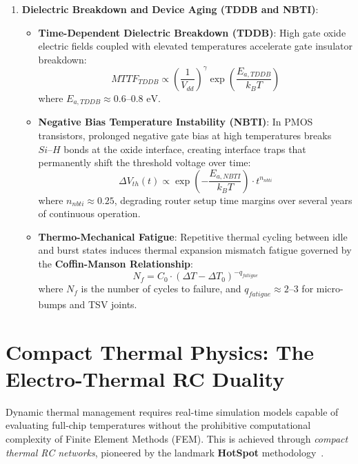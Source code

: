 \begin{enumerate}
    \item \textbf{Dielectric Breakdown and Device Aging (TDDB and NBTI)}: 
    \begin{itemize}
        \item \textbf{Time-Dependent Dielectric Breakdown (TDDB)}: High gate oxide electric fields coupled with elevated temperatures accelerate gate insulator breakdown:
        \begin{equation}
        MTTF_{TDDB} \propto \left(\frac{1}{V_{dd}}\right)^{\gamma} \exp\left(\frac{E_{a, TDDB}}{k_B T}\right)
        \label{eq:tddb}
        \end{equation}
        where $E_{a, TDDB} \approx 0.6\text{--}0.8\text{ eV}$.
        \item \textbf{Negative Bias Temperature Instability (NBTI)}: In PMOS transistors, prolonged negative gate bias at high temperatures breaks $Si\text{--}H$ bonds at the oxide interface, creating interface traps that permanently shift the threshold voltage over time:
        \begin{equation}
        \Delta V_{th}(t) \propto \exp\left(-\frac{E_{a, NBTI}}{k_B T}\right) \cdot t^{n_{nbti}}
        \label{eq:nbti}
        \end{equation}
        where $n_{nbti} \approx 0.25$, degrading router setup time margins over several years of continuous operation.
        \item \textbf{Thermo-Mechanical Fatigue}: Repetitive thermal cycling between idle and burst states induces thermal expansion mismatch fatigue governed by the \textbf{Coffin-Manson Relationship}:
        \begin{equation}
        N_f = C_0 \cdot (\Delta T - \Delta T_0)^{-q_{fatigue}}
        \label{eq:coffin_manson}
        \end{equation}
        where $N_f$ is the number of cycles to failure, and $q_{fatigue} \approx 2\text{--}3$ for micro-bumps and TSV joints.
    \end{itemize}
\end{enumerate}

\section{Compact Thermal Physics: The Electro-Thermal RC Duality}
\label{sec:electro-thermal-duality}

Dynamic thermal management requires real-time simulation models capable of evaluating full-chip temperatures without the prohibitive computational complexity of Finite Element Methods (FEM). This is achieved through \emph{compact thermal RC networks}, pioneered by the landmark \textbf{HotSpot} methodology~\cite{Huang2006,Skadron2003}.

